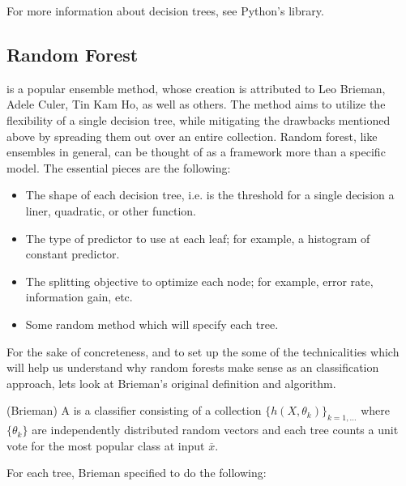For more information about decision trees, see Python's  library. 


        

\subsection{Random Forest}

 is a popular ensemble method, whose creation is attributed to Leo Brieman, Adele Culer, Tin Kam Ho, as well as others. The method aims to utilize the flexibility of a single decision tree, while mitigating the drawbacks mentioned above by spreading them out over an entire collection. Random forest, like ensembles in general, can be thought of as a framework more than a specific model. The essential pieces are the following:

\begin{itemize}
    \item The shape of each decision tree, i.e. is the threshold for a single decision a liner, quadratic, or other function.
    \item The type of predictor to use at each leaf; for example, a histogram of constant predictor.
    \item The splitting objective to optimize each node; for example, error rate, information gain, etc.
    \item Some random method which will specify each tree. 
\end{itemize}

For the sake of concreteness, and to set up the some of the technicalities which will help us understand why random forests make sense as an classification approach, lets look at Brieman's original definition and algorithm.
            
\vspace{.3in}

\begin{definition} (Brieman) A  is a classifier consisting of a collection $\{h(X, \theta_k)\}_{k=1, \dots}$ where $\{\theta_k\}$ are independently distributed random vectors and each tree counts a unit vote for the most popular class at input $\overline{x}$.
\end{definition}




For each tree, Brieman specified to do the following:

